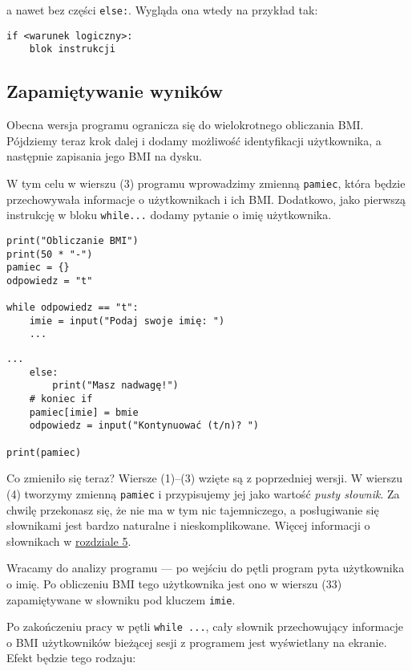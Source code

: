 \documentclass[a4paper]{article}
\begin{document}
a nawet bez części \lstinline|else:|. Wygląda ona wtedy na przykład tak:

\lstset{numbers=none}
\begin{lstlisting}
if <warunek logiczny>:
    blok instrukcji
\end{lstlisting}

\subsection{Zapamiętywanie wyników}

Obecna wersja programu ogranicza się do wielokrotnego obliczania BMI. Pójdziemy teraz krok dalej i dodamy możliwość identyfikacji użytkownika, a następnie zapisania jego BMI na dysku.

W tym celu w wierszu (3) programu wprowadzimy zmienną \texttt{pamiec}, która będzie przechowywała informacje o użytkownikach i ich BMI. Dodatkowo, jako pierwszą instrukcję w bloku \lstinline|while...| dodamy pytanie o imię użytkownika.

\lstset{numbers=left}
\begin{lstlisting}
print("Obliczanie BMI")
print(50 * "-")
pamiec = {}
odpowiedz = "t"

while odpowiedz == "t":
    imie = input("Podaj swoje imię: ")
    ...
\end{lstlisting}
\begin{lstlisting}[firstnumber=29]
    ...
    else:
        print("Masz nadwagę!")
    # koniec if
    pamiec[imie] = bmie
    odpowiedz = input("Kontynuować (t/n)? ")

print(pamiec)
\end{lstlisting}

Co zmieniło się teraz? Wiersze (1)--(3) wzięte są z poprzedniej wersji. W wierszu (4) tworzymy zmienną \lstinline|pamiec| i przypisujemy jej jako wartość \emph{pusty słownik}. Za chwilę przekonasz się, że nie ma w tym nic tajemniczego, a posługiwanie się słownikami jest bardzo naturalne i nieskomplikowane. Więcej informacji o słownikach w \hyperref[slowniki]{rozdziale 5}.

Wracamy do analizy programu --- po wejściu do pętli program pyta użytkownika o imię. Po obliczeniu BMI tego użytkownika jest ono w wierszu (33) zapamiętywane w słowniku pod kluczem \texttt{imie}.

Po zakończeniu pracy w pętli \lstinline|while ...|, cały słownik przechowujący informacje o BMI użytkowników bieżącej sesji z programem jest wyświetlany na ekranie. Efekt będzie tego rodzaju:
\end{document}
